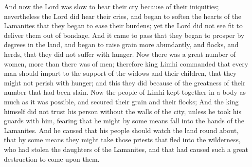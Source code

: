 \bverse \iffalse And now the Lord was slow to hear their cry because of their iniquities; nevertheless the Lord did hear their cries, and began to soften the hearts of the Lamanites that they began to ease their burdens; yet the Lord did not see fit to deliver them out of bondage. \fi
And now the Lord was slow to hear their cry because of their iniquities; nevertheless the Lord did hear their cries, and began to soften the hearts of the Lamanites that they began to ease their burdens; yet the Lord did not see fit to deliver them out of bondage.
\bverse \iffalse And it came to pass that they began to prosper by degrees in the land, and began to raise grain more abundantly, and flocks, and herds, that they did not suffer with hunger. \fi
And it came to pass that they began to prosper by degrees in the land, and began to raise grain more abundantly, and flocks, and herds, that they did not suffer with hunger.
\bverse \iffalse Now there was a great number of women, more than there was of men; therefore king Limhi commanded that every man should impart to the support of the widows and their children, that they might not perish with hunger; and this they did because of the greatness of their number that had been slain. \fi
Now there was a great number of women, more than there was of men; therefore king Limhi commanded that every man should impart to the support of the widows and their children, that they might not perish with hunger; and this they did because of the greatness of their number that had been slain.
\bverse \iffalse Now the people of Limhi kept together in a body as much as it was possible, and secured their grain and their flocks; \fi
Now the people of Limhi kept together in a body as much as it was possible, and secured their grain and their flocks;
\bverse \iffalse And the king himself did not trust his person without the walls of the city, unless he took his guards with him, fearing that he might by some means fall into the hands of the Lamanites. \fi
And the king himself did not trust his person without the walls of the city, unless he took his guards with him, fearing that he might by some means fall into the hands of the Lamanites.
\bverse \iffalse And he caused that his people should watch the land round about, that by some means they might take those priests that fled into the wilderness, who had stolen the daughters of the Lamanites, and that had caused such a great destruction to come upon them. \fi
And he caused that his people should watch the land round about, that by some means they might take those priests that fled into the wilderness, who had stolen the daughters of the Lamanites, and that had caused such a great destruction to come upon them.
